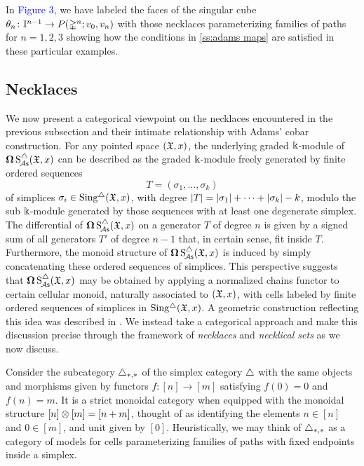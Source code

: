 In \textcolor{blue}{Figure 3}, we have labeled the faces of the singular cube
$\theta_n \colon \mathbb{I}^{n-1} \to P(\mathbb{\Delta}^n;v_0,v_n)$ with those necklaces parameterizing families of paths for $n=1,2,3$ showing how the conditions in \cref{ss:adams maps} are satisfied in these particular examples.

\subsection{Necklaces}

We now present a categorical viewpoint on the necklaces encountered in the previous subsection and their intimate relationship with Adams' cobar construction.
For any pointed space $(\mathfrak{X},x)$, the underlying graded $\Bbbk$-module of $\operatorname{\mathbf{\Omega}} \operatorname{S^{\triangle}_{\!{\mathcal{A}\mathsf{s}}}}(\mathfrak{X},x)$ can be described as the graded $\Bbbk$-module freely generated by finite ordered sequences
\[
T = (\sigma_1, \dots, \sigma_k)
\]
of simplices $\sigma_i \in \operatorname{Sing^{\triangle}}(\mathfrak{X},x)$, with degree $\lvert T\rvert = \lvert\sigma_1\rvert+\dots+\lvert\sigma_k\rvert - k$, modulo the sub $\Bbbk$-module generated by those sequences with at least one degenerate simplex.
The differential of $\operatorname{\mathbf{\Omega}} \operatorname{S^{\triangle}_{\!{\mathcal{A}\mathsf{s}}}}(\mathfrak{X},x)$ on a generator $T$ of degree $n$ is given by a signed sum of all generators $T'$ of degree $n-1$ that, in certain sense, fit inside $T$.
Furthermore, the monoid structure of $\operatorname{\mathbf{\Omega}} \operatorname{S^{\triangle}_{\!{\mathcal{A}\mathsf{s}}}}(\mathfrak{X},x)$ is induced by simply concatenating these ordered sequences of simplices.
This perspective suggests that $\operatorname{\mathbf{\Omega}} \operatorname{S^{\triangle}_{\!{\mathcal{A}\mathsf{s}}}}(\mathfrak{X},x)$ may be obtained by applying a normalized chains functor to certain cellular monoid, naturally associated to $(\mathfrak{X},x)$, with cells labeled by finite ordered sequences of simplices in $\operatorname{Sing^{\triangle}}(\mathfrak{X},x)$.
A geometric construction reflecting this idea was described in \cite{baues1980geometry}.
We instead take a categorical approach and make this discussion precise through the framework of \textit{necklaces} and \textit{necklical sets} as we now discuss.

Consider the subcategory $\triangle_{*,*}$ of the simplex category $\triangle$ with the same objects and morphisms given by functors $f \colon [n] \to [m]$ satisfying $f(0) = 0$ and $f(n) = m$.
It is a strict monoidal category when equipped with the monoidal structure $[n] \otimes [m] = [n+m]$, thought of as identifying the elements $n \in [n]$ and $0 \in [m]$, and unit given by $[0]$.
Heuristically, we may think of $\triangle_{*,*}$ as a category of models for cells parameterizing families of paths with fixed endpoints inside a simplex.

